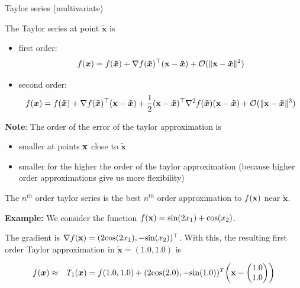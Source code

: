 \begin{vbframe}{Taylor series (multivariate)}

  The Taylor series at point $\bm{\tilde x}$ is
  
  \begin{itemize}
    \item first order: 
    $$
    f(\bm{x}) = f(\bm{\tilde{x}}) + \nabla f(\bm{\tilde{x}})^\top(\mathbf{x}-\bm{\tilde{x}}) + \mathcal{O}(\|\mathbf{x} - \bm{\tilde{x}}\|^2) 
    $$
    \item second order: 
    $$
    f(\bm{x}) = f(\bm{\tilde{x}}) + \nabla f(\bm{\tilde{x}})^\top(\mathbf{x}-\bm{\tilde{x}}) +
    \frac 12(\mathbf{x}-\bm{\tilde{x}})^\top\nabla^2 f(\bm{\tilde{x}})(\mathbf{x}-\bm{\tilde{x}}) + \mathcal{O}(\|\mathbf{x} - \bm{\tilde{x}}\|^3)
    $$
  \end{itemize}
  
  \textbf{Note}: The order of the error of the taylor approximation is 
  \begin{itemize}
    \item smaller at points $\mathbf{x}$ close to $\bm{\tilde x}$
    \item smaller for the higher the order of the taylor approximation (because higher order approximations give us more flexibility)
  \end{itemize}
  
  The $n^{th}$ order taylor series is the best $n^{th}$ order approximation to $f(\mathbf{x})$ near $\bm{\tilde{x}}$.  
  \framebreak 
  
  \textbf{Example: } We consider the function $f(\mathbf{x}) = \text{sin}(2x_1) + \text{cos}(x_2)$.
  
  \vspace*{0.2cm}
  
  The gradient is $\nabla f(\mathbf{x}) = (2\text{cos}(2x_1), -\text{sin}(x_2))^\top$. With this, the resulting first order Taylor approximation in $\bm{\tilde x} = (1.0, 1.0)$ is
  \vspace*{-0.5cm}
  
  \begin{eqnarray*}
  f(\bm{x}) &\approx& T_1(\bm{x}) = f(1.0, 1.0) + (2\text{cos}(2.0), -\text{sin}(1.0))^T\biggl(\mathbf{x}- \begin{pmatrix}1.0 \\ 1.0 \end{pmatrix}\biggr) 
  \end{eqnarray*}
  

\end{vbframe}
